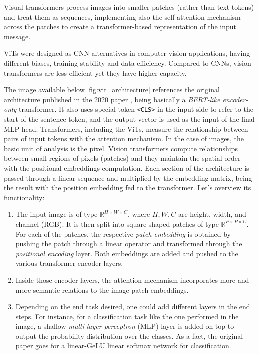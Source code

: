 Visual transformers process images into smaller patches (rather than text tokens) and treat them as sequences, implementing also the self-attention mechanism across the patches to create a transformer-based representation of the input message.

ViTs were designed as CNN alternatives in computer vision applications, having different biases, training stability and data efficiency. Compared to CNNs, vision transformers are less efficient yet they have higher capacity. 

The image available below \ref{fig:vit_architecture} references the original architecture published in the 2020 paper \cite{dosovitskiy2021imageworth16x16words}, being basically a \textit{BERT-like encoder-only} transformer. It also uses special token \texttt{<CLS>} in the input side to refer to the start of the sentence token, and the output vector is used as the input of the final MLP head. Transformers, including the ViTs, measure the relationship between pairs of input tokens with the attention mechanism. In the case of images, the basic unit of analysis is the pixel. Vision transformers compute relationships between small regions of pixels (patches) and they maintain the spatial order with the positional embeddings computation. Each section of the architecture is passed through a linear sequence and multiplied by the embedding matrix, being the result with the position embedding fed to the transformer. Let's overview its functionality:

\begin{enumerate}
	\item The input image is of type $\mathbb{R}^{H \times W \times C}$, where $H, W, C$ are height, width, and channel (RGB). It is then split into square-shaped patches of type $\mathbb{R}^{P \times P \times C}$. For each of the patches, the respective \textit{patch embedding} is obtained by pushing the patch through a linear operator and transformed through the \textit{positional encoding} layer. Both embeddings are added and pushed to the various transformer encoder layers. 
	
	\item Inside those encoder layers, the attention mechanism incorporates more and more semantic relations to the image patch embeddings. 
	
	\item Depending on the end task desired, one could add different layers in the end steps. For instance, for a classification task like the one performed in the image, a shallow \textit{multi-layer perceptron} (MLP) layer is added on top to output the probability distribution over the classes. As a fact, the original paper goes for a linear-GeLU linear softmax network for classification. 
	
\end{enumerate}

